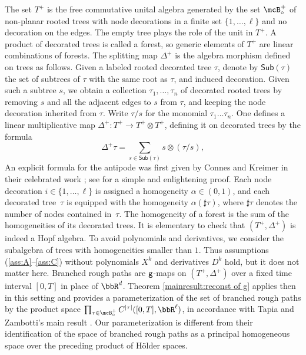 \begin{remarks*}
\begin{enumerate}
The set $T^+$ is the free commutative unital algebra generated by the set $\mcB^+_\circ$ of non-planar rooted trees with node decorations in a finite set $\{1,\dots,\ell\}$ and no decoration on the edges. The empty tree plays the role of the unit in $T^+$. A product of decorated trees is called a forest, so generic elements of $T^+$ are linear combinations of forests. The splitting map $\Delta^+$ is the algebra morphism defined on trees as follows. Given a labeled rooted decorated tree $\tau$, denote by $\textsf{Sub}(\tau)$ the set of subtrees of $\tau$ with the same root as $\tau$, and induced decoration. Given such a subtree $s$, we obtain a collection $\tau_1,\dots,\tau_n$ of decorated rooted trees by removing $s$ and all the adjacent edges to $s$ from $\tau$, and keeping the node decoration inherited from $\tau$. Write $\tau/s$ for the monomial $\tau_1\dots\tau_n$. One defines a linear multiplicative map $\Delta^+ : T^+ \to T^+\otimes T^+$, defining it on decorated trees by the formula\vspace*{-3pt}
\[
\Delta^+\tau = \sum_{s\in\textsf{Sub}(\tau)} s\otimes (\tau/s),
\]
An explicit formula for the antipode was first given by Connes and Kreimer in their celebrated work \cite{CK}; see \cite{CHV} for a simple and enlightening proof. Each node decoration $i\in\{1,\dots,\ell\}$ is assigned a homogeneity $\alpha\in(0,1)$,
and each decorated tree~$\tau$ is equipped with the homogeneity $\alpha(\sharp\tau)$, where $\sharp\tau$ denotes the number of nodes \hbox{contained} in~$\tau$. The homogeneity of a forest is the sum of the homogeneities of its decorated trees. It is elementary to check that $(T^+,\Delta^+)$ is indeed a Hopf algebra. To avoid polynomials and derivatives, we consider the subalgebra of trees with homo\-geneities smaller than $1$. Thus assumptions (\ref{ass:A}--\ref{ass:C}) without polynomials $X^k$ and derivatives $D^k$ hold, but it does not matter here.
Branched rough paths are $\sf g$-maps on $(T^+,\Delta^+)$ over a fixed time interval $[0,T]$ in place of $\bbR^d$. Theorem \ref{mainresult:reconst of g} applies then in this setting and provides a parameterization of the set of branched rough paths by the product space $\prod_{\tau\in\mcB_\circ^+} C^{\vert\tau\vert}([0,T], \bbR^\ell)$, in accordance with Tapia and Zambotti's main result \cite[Th.\,1.2 \& Cor.\,1.3]{TZ18}. Our parameterization is different from their identification of the space of branched rough paths as a principal homogeneous space over the preceding product of Hölder spaces.


\end{enumerate}
\end{remarks*}
